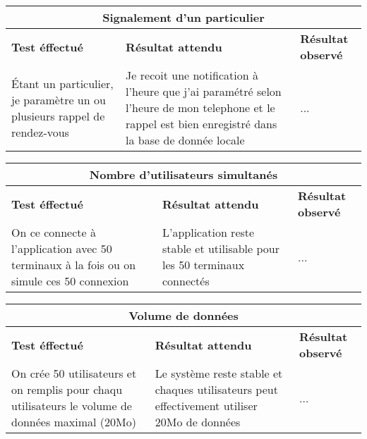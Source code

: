 \documentclass{article}
\begin{document}
  \begin{center}
    \begin{tabular}{|p{5cm}|p{5cm}|p{5cm}|}
      \hline
      \multicolumn{3}{|c|}{\textbf{Signalement d'un particulier}} \\
      \hline
      \textbf{Test éffectué} & \textbf{Résultat attendu} & \textbf{Résultat observé} \\
      \hline

      Étant un particulier, je paramètre un ou plusieurs rappel de rendez-vous&
      Je recoit une notification à l'heure que j'ai paramétré selon l'heure de mon telephone
      et le rappel est bien enregistré dans la base de donnée locale&
      ... \\


      \hline

    \end{tabular}
  \end{center}

  \begin{center}
    \begin{tabular}{|p{5cm}|p{5cm}|p{5cm}|}
      \hline
      \multicolumn{3}{|c|}{\textbf{Nombre d'utilisateurs simultanés}} \\
      \hline
      \textbf{Test éffectué} & \textbf{Résultat attendu} & \textbf{Résultat observé} \\
      \hline

      On ce connecte à l'application avec 50 terminaux à la fois ou on simule ces 50 connexion&
      L'application reste stable et utilisable pour les 50 terminaux connectés&
      ... \\


      \hline

    \end{tabular}
  \end{center}

  \begin{center}
    \begin{tabular}{|p{5cm}|p{5cm}|p{5cm}|}
      \hline
      \multicolumn{3}{|c|}{\textbf{Volume de données}} \\
      \hline
      \textbf{Test éffectué} & \textbf{Résultat attendu} & \textbf{Résultat observé} \\
      \hline

      On crée 50 utilisateurs et on remplis pour chaqu utilisateurs le volume de données maximal (20Mo)&
      Le système reste stable et chaques utilisateurs peut effectivement utiliser 20Mo de données&
      ... \\


      \hline

    \end{tabular}
  \end{center}
\end{document}
